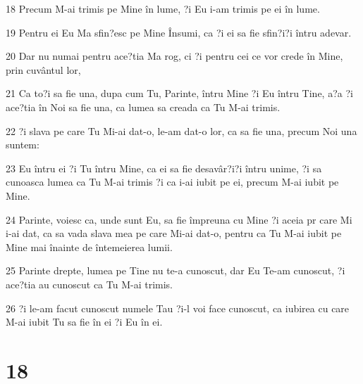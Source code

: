 \par 18 Precum M-ai trimis pe Mine în lume, ?i Eu i-am trimis pe ei în lume.
\par 19 Pentru ei Eu Ma sfin?esc pe Mine Însumi, ca ?i ei sa fie sfin?i?i întru adevar.
\par 20 Dar nu numai pentru ace?tia Ma rog, ci ?i pentru cei ce vor crede în Mine, prin cuvântul lor,
\par 21 Ca to?i sa fie una, dupa cum Tu, Parinte, întru Mine ?i Eu întru Tine, a?a ?i ace?tia în Noi sa fie una, ca lumea sa creada ca Tu M-ai trimis.
\par 22 ?i slava pe care Tu Mi-ai dat-o, le-am dat-o lor, ca sa fie una, precum Noi una suntem:
\par 23 Eu întru ei ?i Tu întru Mine, ca ei sa fie desavâr?i?i întru unime, ?i sa cunoasca lumea ca Tu M-ai trimis ?i ca i-ai iubit pe ei, precum M-ai iubit pe Mine.
\par 24 Parinte, voiesc ca, unde sunt Eu, sa fie împreuna cu Mine ?i aceia pr care Mi i-ai dat, ca sa vada slava mea pe care Mi-ai dat-o, pentru ca Tu M-ai iubit pe Mine mai înainte de întemeierea lumii.
\par 25 Parinte drepte, lumea pe Tine nu te-a cunoscut, dar Eu Te-am cunoscut, ?i ace?tia au cunoscut ca Tu M-ai trimis.
\par 26 ?i le-am facut cunoscut numele Tau ?i-l voi face cunoscut, ca iubirea cu care M-ai iubit Tu sa fie în ei ?i Eu în ei.

\chapter{18}

